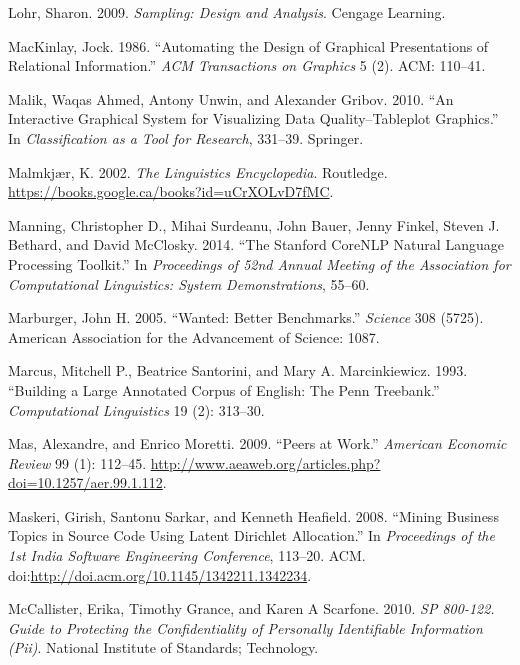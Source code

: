 \documentclass[]{krantz}
\begin{document}
\hypertarget{ref-lohr2009sampling}{}
Lohr, Sharon. 2009. \emph{Sampling: Design and Analysis}. Cengage
Learning.

\hypertarget{ref-mackinlay1986automating}{}
MacKinlay, Jock. 1986. ``Automating the Design of Graphical
Presentations of Relational Information.'' \emph{ACM Transactions on
Graphics} 5 (2). ACM: 110--41.

\hypertarget{ref-malik2010interactive}{}
Malik, Waqas Ahmed, Antony Unwin, and Alexander Gribov. 2010. ``An
Interactive Graphical System for Visualizing Data Quality--Tableplot
Graphics.'' In \emph{Classification as a Tool for Research}, 331--39.
Springer.

\hypertarget{ref-malmkjar-02}{}
Malmkjær, K. 2002. \emph{The Linguistics Encyclopedia}. Routledge.
\url{https://books.google.ca/books?id=uCrXOLvD7fMC}.

\hypertarget{ref-manning2014stanford}{}
Manning, Christopher D., Mihai Surdeanu, John Bauer, Jenny Finkel,
Steven J. Bethard, and David McClosky. 2014. ``The Stanford CoreNLP
Natural Language Processing Toolkit.'' In \emph{Proceedings of 52nd
Annual Meeting of the Association for Computational Linguistics: System
Demonstrations}, 55--60.

\hypertarget{ref-marburger2005wanted}{}
Marburger, John H. 2005. ``Wanted: Better Benchmarks.'' \emph{Science}
308 (5725). American Association for the Advancement of Science: 1087.

\hypertarget{ref-marcus-93}{}
Marcus, Mitchell P., Beatrice Santorini, and Mary A. Marcinkiewicz.
1993. ``Building a Large Annotated Corpus of English: The Penn
Treebank.'' \emph{Computational Linguistics} 19 (2): 313--30.

\hypertarget{ref-Mas2009}{}
Mas, Alexandre, and Enrico Moretti. 2009. ``Peers at Work.''
\emph{American Economic Review} 99 (1): 112--45.
\url{http://www.aeaweb.org/articles.php?doi=10.1257/aer.99.1.112}.

\hypertarget{ref-maskeri-08}{}
Maskeri, Girish, Santonu Sarkar, and Kenneth Heafield. 2008. ``Mining
Business Topics in Source Code Using Latent Dirichlet Allocation.'' In
\emph{Proceedings of the 1st India Software Engineering Conference},
113--20. ACM.
doi:\href{https://doi.org/http://doi.acm.org/10.1145/1342211.1342234}{http://doi.acm.org/10.1145/1342211.1342234}.

\hypertarget{ref-mccallister2010sp}{}
McCallister, Erika, Timothy Grance, and Karen A Scarfone. 2010. \emph{SP
800-122. Guide to Protecting the Confidentiality of Personally
Identifiable Information (Pii)}. National Institute of Standards;
Technology.
\end{document}

